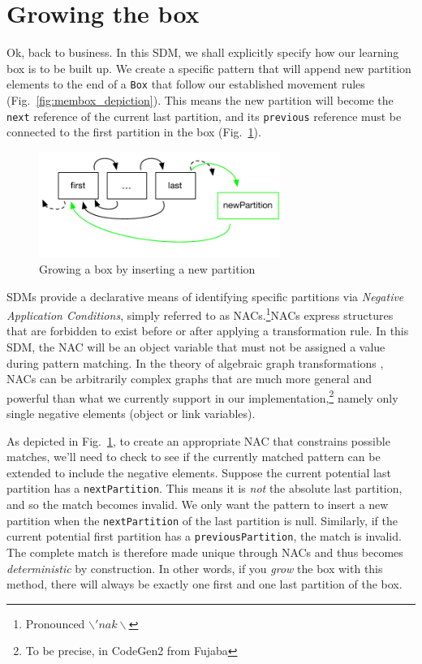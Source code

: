 \newpage
\section{Growing the box}
\genHeader

Ok, back to business. In this SDM, we shall explicitly specify how our learning box is to be built up. We create a specific pattern that will append new
partition elements to the end of a \texttt{Box} that follow our established movement rules (Fig.~\ref{fig:membox_depiction}). This means the new partition will
become the \texttt{next} reference of the current last partition, and its \texttt{previous} reference must be connected to the first partition in the box
(Fig.~\ref{fig:goal_grow}).

\begin{figure}[htbp]
 	\centering
  	\includegraphics[width=0.7\textwidth]{growBoxNACGoal.pdf}
	\caption{Growing a box by inserting a new partition}
	\label{fig:goal_grow}
\end{figure}
\FloatBarrier

SDMs provide a declarative means of identifying specific partitions via \emph{Negative Application Conditions}, simply referred to as
\mbox{NAC}s.\footnote{Pronounced $\backslash 'nak \backslash$}\mbox{NAC}s express structures that are forbidden to exist before or after applying a
transformation rule. In this SDM, the \mbox{NAC} will be an object variable that must not be assigned a value during pattern matching. In the theory of
algebraic graph transformations \cite{EEPT06}, \mbox{NACs} can be arbitrarily complex graphs that are much more general and powerful than what we currently
support in our implementation,\footnote{To be precise, in CodeGen2 from Fujaba} namely only single negative elements (object or link variables).

As depicted in Fig.~\ref{fig:goal_grow}, to create an appropriate \mbox{NAC} that constrains possible matches, we'll need to check to see if the currently
matched pattern can be extended to include the negative elements. Suppose the current potential last partition has a \texttt{nextPartition}. This means it
is \emph{not} the absolute last partition, and so the match becomes invalid. We only want the pattern to insert a new partition when the \texttt{nextPartition}
of the last partition is null. Similarly, if the current potential first partition has a \texttt{previousPartition}, the match is invalid. The complete match is
therefore made unique through NACs and thus becomes \emph{deterministic} by construction. In other words, if you \emph{grow} the box with this method, there
will always be exactly one first and one last partition of the box.

